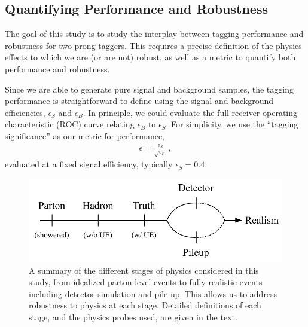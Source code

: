 \documentclass[11pt]{cernrep}
\begin{document}
\subsection{Quantifying Performance and Robustness}\label{jetsub_2prong_sec:pres}


The goal of this study is to study the interplay between tagging performance and robustness for two-prong taggers.
%
This requires a precise definition of the physics effects to which we are (or are not) robust, as well as a metric to quantify both performance and robustness.


Since we are able to generate pure signal and background samples, the tagging performance is straightforward to define using the signal and background efficiencies, $\epsilon_S$ and $\epsilon_B$.
%
In principle, we could evaluate the full receiver operating characteristic (ROC) curve relating $\epsilon_B$ to $\epsilon_S$.
%
For simplicity, we use the ``tagging significance'' as our metric for performance,
\begin{align}\label{eq:significance}
\epsilon=\frac{\epsilon_S}{\sqrt{\epsilon_B}}\,,
\end{align}
evaluated at a fixed signal efficiency, typically $\epsilon_S = 0.4$.

\begin{figure}[t]
\begin{center}
\includegraphics[width=0.75\columnwidth]{jetsub_2prong_realism_levels}
\end{center}
\caption{A summary of the different stages of physics considered in
  this study, from idealized parton-level events to fully realistic
  events including detector simulation and pile-up.
  This allows us to
  address robustness to physics at each stage.
  Detailed definitions of
  each stage, and the physics probes used, are given in the text.
   }
\label{jetsub_2prong_fig:realism}
\end{figure}
\end{document}

